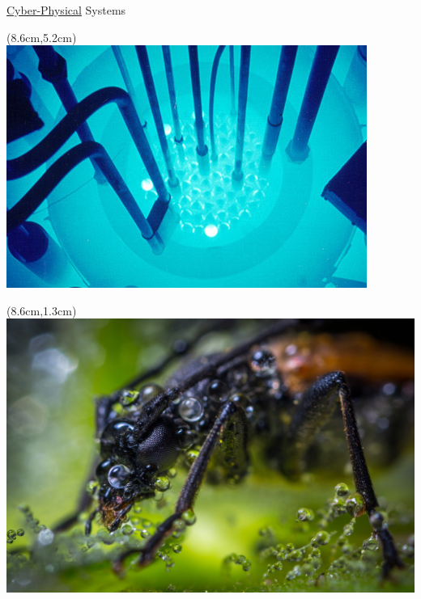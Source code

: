 \documentclass[aspectratio=169]{beamer}
\begin{document}
\begin{frame}{\underline{Cyber-Physical} Systems}
\begin{textblock*}{5cm}(8.6cm,5.2cm)
\includegraphics[scale=0.32]{Images/nuclear.jpg}
\end{textblock*}

\begin{textblock*}{5cm}(8.6cm,1.3cm)
\includegraphics[scale=0.0357]{Images/beetle.jpg} 
\end{textblock*}
\end{frame}
\end{document}
